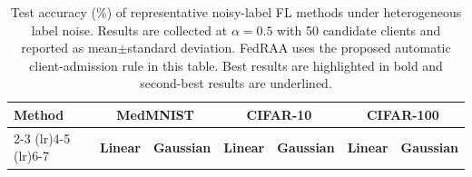 \documentclass[conference]{IEEEtran}
\theoremstyle{definition}
\theoremstyle{remark}
\begin{document}
\begin{table}[t]
\centering
\caption{Test accuracy (\%) of representative noisy-label FL methods under heterogeneous label noise. Results are collected at $\alpha=0.5$ with 50 candidate clients and reported as mean$\pm$standard deviation. FedRAA uses the proposed automatic client-admission rule in this table. Best results are highlighted in bold and second-best results are underlined.}
\label{tab:noisy_fl_accuracy}
\setlength{\tabcolsep}{3.2pt}
\renewcommand{\arraystretch}{1.15}
\begin{tabular}{lcccccc}
\toprule
\multirow{2}{*}{\textbf{Method}} 
& \multicolumn{2}{c}{\textbf{MedMNIST}} 
& \multicolumn{2}{c}{\textbf{CIFAR-10}} 
& \multicolumn{2}{c}{\textbf{CIFAR-100}} \\
\cmidrule(lr){2-3} \cmidrule(lr){4-5} \cmidrule(lr){6-7}
& \textbf{Linear} & \textbf{Gaussian} & \textbf{Linear} & \textbf{Gaussian} & \textbf{Linear} & \textbf{Gaussian} \\
\midrule


\end{tabular}
\end{table}
\end{document}
